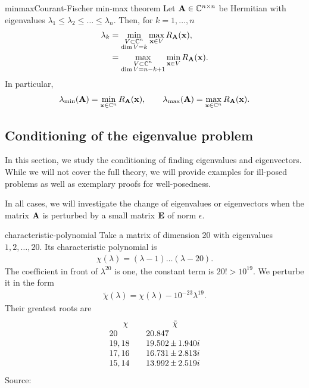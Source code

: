 \begin{Theorem*}{minmax}{Courant-Fischer min-max theorem}
  Let $\mathbf A\in\mathbb C^{n\times n}$ be Hermitian with eigenvalues
  $\lambda_1 \le \lambda_2\le\dots\le \lambda_n$. Then, for $k=1,\dots,n$
  \begin{align}
    \lambda_k
    &= \min_{\substack{V \subset \mathbb C^n\\\dim V = k}} \max_{\mathbf x\in V} R_\mathbf A(\mathbf x),\\
    &= \max_{\substack{V \subset \mathbb C^n\\\dim V = n-k+1}} \min_{\mathbf x\in V} R_\mathbf A(\mathbf x).
  \end{align}
  In particular,
  \begin{gather}
    \lambda_{\min}(\mathbf A) = \min_{\mathbf x\in\mathbb C^n} R_\mathbf A(\mathbf x),
    \qquad
    \lambda_{\max}(\mathbf A) = \max_{\mathbf x\in\mathbb C^n} R_\mathbf A(\mathbf x).
  \end{gather}
\end{Theorem*}

\subsection{Conditioning of the eigenvalue problem}
In this section, we study the conditioning of finding eigenvalues and
eigenvectors. While we will not cover the full theory, we will provide
examples for ill-posed problems as well as exemplary proofs for
well-posedness.

In all cases, we will investigate the change of eigenvalues or
eigenvectors when the matrix $\mathbf A$ is perturbed by a small matrix
$\mathbf E$ of norm $\epsilon$.

\begin{Example}{characteristic-polynomial}
  Take a matrix of dimension 20 with eigenvalues $1,2,\ldots,20$. Its
  characteristic polynomial is
  \begin{gather}
    \chi(\lambda) = (\lambda-1)\dots(\lambda-20).
  \end{gather}
  The coefficient in front of $\lambda^{20}$ is one, the constant term is $20! > 10^{19}$.
  We perturbe it in the form
  \begin{gather}
    \tilde \chi(\lambda) = \chi(\lambda) - 10^{-23}\lambda^{19}.
  \end{gather}
  Their greatest roots are
  \begin{gather}
    \begin{array}{l@{\qquad}l@{\,}c@{\,}l}
      \multicolumn{1}{c}{\chi}&
      \multicolumn{3}{c}{\tilde \chi}\\
      20&20.847\\
      19,18&19.502&\pm&1.940i\\
      17,16&16.731&\pm&2.813i\\
      15,14&13.992&\pm&2.519i\\
    \end{array}
  \end{gather}
  {\tiny Source: \cite{DeuflhardHohmann08}}
\end{Example}

